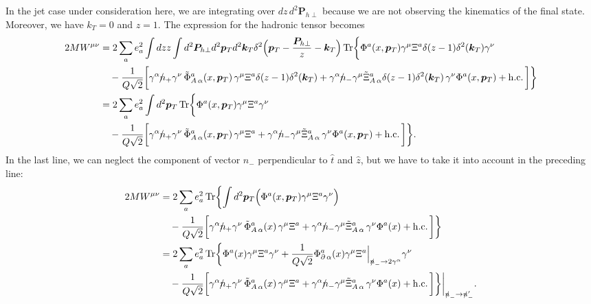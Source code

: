 \documentclass[preprintnumbers,floatfix,nofootinbib]{revtex4}
\newcommand{\nslash}{n \hspace{-0.24cm} / \,}
\newcommand{\Tr}{\operatorname*{Tr}\nolimits} %
\begin{document}
In the jet case under consideration here, we are integrating over 
$dz\, d^2\bm{P}_{h\perp}$  because we are not observing the kinematics of the
final state. 
Moreover, we have $k_T=0$ and $z=1$. 
The expression for the hadronic tensor becomes
\begin{equation} 
\begin{split} 
2M W^{\mu\nu} 
&= 2 \sum_a   e_a^2 \int dz z \int d^2 \bm{P}_{h \perp} d^2 \bm{p}_T d^2
\bm{k}_T
\delta^2\Bigl(\bm{p}_T - \frac{\bm{P}_{h\perp}}{z}-\bm{k}_T\Bigr) 
\Tr \biggl\{
  \Phi^a (x,\bm{p}_T) \gamma^\mu \Xi^a \delta(z-1) \delta^2(\bm{k}_T) \gamma^\nu
\\
& \quad 
- \frac{1}{Q\sqrt{2}} \biggl[
  \gamma^\alpha \nslash_+ \gamma^\nu \,
  \tilde{\Phi}^a_{A\, \alpha}(x,\bm{p}_T)\, \gamma^\mu 
\Xi^a \delta(z-1) \delta^2(\bm{k}_T) 
+ \gamma^\alpha \nslash_- \gamma^\mu
  \tilde{\Xi}^a_{A\, \alpha} \delta(z-1) \delta^2(\bm{k}_T)\, \gamma^\nu 
  \Phi^a (x,\bm{p}_T)  
  + \mathrm{h.c.} \,\biggr] \biggr\}
\\
&= 2 \sum_a   e_a^2 \int d^2 \bm{p}_T 
\Tr \biggl\{
  \Phi^a (x,\bm{p}_T) \gamma^\mu \Xi^a  \gamma^\nu
\\
& \quad 
- \frac{1}{Q\sqrt{2}} \biggl[
  \gamma^\alpha \nslash_+ \gamma^\nu \,
  \tilde{\Phi}^a_{A\, \alpha}(x,\bm{p}_T)\, \gamma^\mu 
\Xi^a
+ \gamma^\alpha \nslash_- \gamma^\mu
  \tilde{\Xi}^a_{A\, \alpha} \, \gamma^\nu 
  \Phi^a (x,\bm{p}_T)  
  + \mathrm{h.c.} \,\biggr] \biggr\}.
\label{eq3}
\end{split} 
\end{equation} 
In the last line, we can neglect the component of vector $n_-$
perpendicular to $\hat{t}$ and $\hat{z}$, but we have to take it into account
in the preceding line:
\begin{equation} 
\begin{split} 
2M W^{\mu\nu} 
&= 2 \sum_a   e_a^2  
\Tr \biggl\{\int d^2 \bm{p}_T \Bigl( 
  \Phi^a (x,\bm{p}_T) \gamma^\mu \Xi^a  \gamma^\nu \Bigr)
\\
& \quad 
- \frac{1}{Q\sqrt{2}} \biggl[
  \gamma^\alpha \nslash_+ \gamma^\nu \,
  \tilde{\Phi}^a_{A\, \alpha}(x)\, \gamma^\mu 
\Xi^a
+ \gamma^\alpha \nslash_- \gamma^\mu
  \tilde{\Xi}^a_{A\, \alpha} \, \gamma^\nu 
  \Phi^a (x)  
  + \mathrm{h.c.} \,\biggr] \biggr\}
\\
&= 2 \sum_a   e_a^2  
\Tr \biggl\{  \Phi^a (x) \gamma^\mu \Xi^a  \gamma^\nu
+  \frac{1}{Q\sqrt{2}}
\Phi_{\partial\,\alpha}^a (x) \gamma^\mu \Xi^{a} \Big\vert_{\slashed{n}_- \to 2 \gamma^{\alpha}} \gamma^\nu 
\\
& \quad 
- \frac{1}{Q\sqrt{2}} \biggl[
  \gamma^\alpha \nslash_+ \gamma^\nu \,
  \tilde{\Phi}^a_{A\, \alpha}(x)\, \gamma^\mu 
\Xi^a
+ \gamma^\alpha \nslash_- \gamma^\mu
  \tilde{\Xi}^a_{A\, \alpha} \, \gamma^\nu 
  \Phi^a (x)  
  + \mathrm{h.c.} \,\biggr] \biggr\}\biggr\vert_{\slashed{n}_- \to \slashed{n}_-'}.
\end{split}
\end{equation} 
\end{document}
